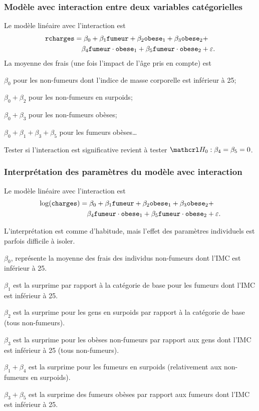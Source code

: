\documentclass[xcolor={dvipsnames}]{beamer}
\begin{document}
\begin{frame}[fragile]
\frametitle{Modèle avec interaction entre deux variables catégorielles}
Le modèle linéaire avec l'interaction est
{ \small 
\begin{align*}
\texttt{rcharges} &= \beta_0 + \beta_1 \texttt{fumeur} + \beta_2 \texttt{obese}_1 +  \beta_3 \texttt{obese}_2 + \\ & \quad \beta_4\texttt{fumeur}\cdot\texttt{obese}_1  + \beta_5\texttt{fumeur}\cdot\texttt{obese}_2  + \varepsilon. 
\end{align*}
}
La moyenne des frais (une fois l'impact de l'âge pris en compte) est
{\small 
\bi 
\item $\beta_0$ pour les non-fumeurs dont l'indice de masse corporelle est inférieur à 25;
\item $\beta_0 + \beta_2$ pour les non-fumeurs en surpoids;
\item $\beta_0 + \beta_3$ pour les non-fumeurs obèses;
\item $\beta_0 +\beta_1+  \beta_3 + \beta_5$ pour les fumeurs obèses\ldots 
\ei
}
Tester si l'interaction est significative revient à tester $\Hy_0: \beta_4=\beta_5=0$.
\end{frame}
\begin{frame}[fragile]
\frametitle{Interprétation des paramètres du modèle avec interaction}
Le modèle linéaire avec l'interaction est
{ \small
\begin{align*}
\log(\texttt{charges}) &= \beta_0 + \beta_1 \texttt{fumeur} + \beta_2 \texttt{obese}_1 +  \beta_3 \texttt{obese}_2+ \\ & \quad \beta_4\texttt{fumeur}\cdot\texttt{obese}_1  + \beta_5\texttt{fumeur}\cdot\texttt{obese}_2  + \varepsilon. 
\end{align*}
}\vspace{-0.5cm}
 \bi
  \item L'interprétation est comme d'habitude, mais l'effet des paramètres individuels est parfois difficile à isoler.
{\small 
\bi
\item $\beta_0$, représente la moyenne des frais des individus non-fumeurs dont l'IMC est inférieur à 25.
\item $\beta_1$ est la surprime par rapport à la catégorie de base pour les fumeurs dont l'IMC est inférieur à 25.
\item $\beta_2$ est la surprime  pour les gens en surpoids par rapport à la catégorie de base (tous non-fumeurs).
\item $\beta_3$  est la surprime  pour les obèses non-fumeurs par rapport aux gens dont l'IMC est inférieur à 25 (tous non-fumeurs).
\item $\beta_1+\beta_4$  est la surprime pour les fumeurs en surpoids (relativement aux non-fumeurs en surpoids).
\item $\beta_3 + \beta_5$  est la surprime des fumeurs obèses par rapport aux fumeurs dont l'IMC est inférieur à 25.
\ei
}
\ei
\end{frame}
\end{document}
